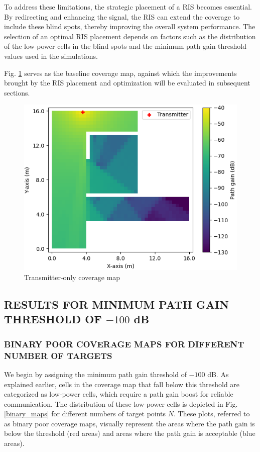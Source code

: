 \documentclass{IEEEoj}
\begin{document}
To address these limitations, the strategic placement of a RIS becomes essential. By redirecting and enhancing the signal, the RIS can extend the coverage to include these blind spots, thereby improving the overall system performance. The selection of an optimal RIS placement depends on factors such as the distribution of the low-power cells in the blind spots and the minimum path gain threshold values used in the simulations.

Fig. \ref{TX_coverage_map} serves as the baseline coverage map, against which the improvements brought by the RIS placement and optimization will be evaluated in subsequent sections.

\begin{figure}
	\centering \includegraphics[width=\linewidth]{Sim_Results/TX_coverage_map.png}
	\caption{Transmitter-only coverage map}
	\label{TX_coverage_map}
\end{figure}

\subsection{RESULTS FOR MINIMUM PATH GAIN THRESHOLD OF $-100$ dB}

\subsubsection{BINARY POOR COVERAGE MAPS FOR DIFFERENT NUMBER OF TARGETS}
We begin by assigning the minimum path gain threshold of $-100$ dB. As explained earlier, cells in the coverage map that fall below this threshold are categorized as low-power cells, which require a path gain boost for reliable communication. The distribution of these low-power cells is depicted in Fig. \ref{binary_maps} for different numbers of target points $N$. These plots, referred to as binary poor coverage maps, visually represent the areas where the path gain is below the threshold (red areas) and areas where the path gain is acceptable (blue areas).
\end{document}
